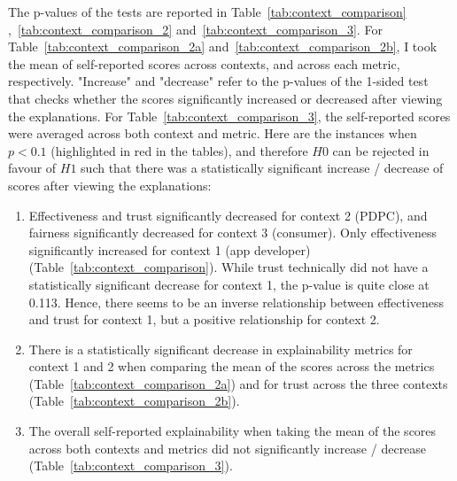 The p-values of the tests are reported in Table~\ref{tab:context_comparison} ,~\ref{tab:context_comparison_2} and~\ref{tab:context_comparison_3}. For Table~\ref{tab:context_comparison_2a} and~\ref{tab:context_comparison_2b}, I took the mean of self-reported scores across contexts, and across each metric, respectively. "Increase" and "decrease" refer to the p-values of the 1-sided test that checks whether the scores significantly increased or decreased after viewing the explanations. For Table~\ref{tab:context_comparison_3}, the self-reported scores were averaged across both context and metric.  Here are the instances when $p<0.1$ (highlighted in red in the tables), and therefore $H0$ can be rejected in favour of $H1$ such that there was a statistically significant increase / decrease of scores after viewing the explanations:
\begin{enumerate}
    \item Effectiveness and trust significantly decreased for context 2 (PDPC), and fairness significantly decreased for context 3 (consumer). Only effectiveness significantly increased for context 1 (app developer) (Table~\ref{tab:context_comparison}). While trust technically did not have a statistically significant decrease for context 1, the p-value is quite close at 0.113. Hence, there seems to be an inverse relationship between effectiveness and trust for context 1, but a positive relationship for context 2.
    \item There is a statistically significant decrease in explainability metrics for context 1 and 2 when comparing the mean of the scores across the metrics (Table~\ref{tab:context_comparison_2a}) and for trust across the three contexts (Table~\ref{tab:context_comparison_2b}).
    \item The overall self-reported explainability when taking the mean of the scores across both contexts and metrics did not significantly increase / decrease (Table~\ref{tab:context_comparison_3}).
\end{enumerate}

